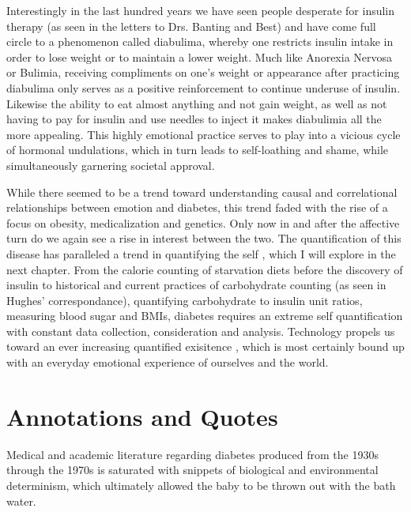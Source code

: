 \documentclass[12pt]{article}
\begin{document}
Interestingly in the last hundred years we have seen people desperate for insulin therapy (as seen in the letters to Drs. Banting and Best) and have come full circle to a phenomenon called diabulima, whereby one restricts insulin intake in order to lose weight or to maintain a lower weight. Much like Anorexia Nervosa or Bulimia, receiving compliments on one's weight or appearance after practicing diabulima only serves as a positive reinforcement to continue underuse of insulin. Likewise the ability to eat almost anything and not gain weight, as well as not having to pay for insulin and use needles to inject it makes diabulimia all the more appealing. This highly emotional practice serves to play into a vicious cycle of hormonal undulations, which in turn leads to self-loathing and shame, while simultaneously garnering societal approval. 

While there seemed to be a trend toward understanding causal and correlational relationships between emotion and diabetes, this trend faded with the rise of a focus on obesity, medicalization and genetics. Only now in and after the affective turn do we again see a rise in interest between the two. The quantification of this disease has paralleled a trend in quantifying the self \citep{lupton_critical_2013}, which I will explore in the next chapter. From the calorie counting of starvation diets before the discovery of insulin to historical and current practices of carbohydrate counting (as seen in Hughes' correspondance), quantifying carbohydrate to insulin unit ratios, measuring blood sugar and BMIs, diabetes requires an extreme self quantification with constant data collection, consideration and analysis. Technology propels us toward an ever increasing quantified exisitence \citep{lupton_technology_2000}, which is most certainly bound up with an everyday emotional experience of ourselves and the world. 




 

\section{Annotations and Quotes}

Medical and academic literature regarding diabetes produced from the 1930s through the 1970s is saturated with snippets of biological and environmental determinism, which ultimately allowed the baby to be thrown out with the bath water.  
\end{document}
